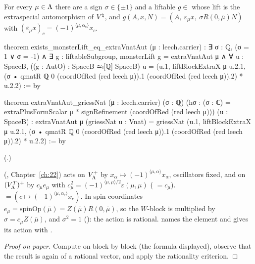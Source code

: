 \begin{theorem}\label{ch21:thm:extra}
For every $\mu\in{\Lambda}$ there are a sign $\sigma\in\{\pm1\}$ and a liftable $g\in$  whose lift is
the extraspecial automorphism  of ${V^{\natural}}$, and $g(A,x,N)=(A,\ \varepsilon_\mu x,\ \sigma R(0,\bar\mu)N)$
with $(\varepsilon_\mu x)_c=(-1)^{\langle\mu,\alpha_c\rangle}x_c$.
\end{theorem}
\begin{leancode}
theorem exists_monsterLift_eq_extraVnatAut (μ : leech.carrier) :
    ∃ σ : ℚ, (σ = 1 ∨ σ = -1) ∧ ∃ g : liftableSubgroup, monsterLift g = extraVnatAut μ ∧
      ∀ u : SpaceB, ((g : AutO) : SpaceB ≃ₗ[ℚ] SpaceB) u
        = (u.1, liftBlockExtraX μ u.2.1,
            (σ • qmatR ℚ 0 (coordOfRed (red leech μ)).1 (coordOfRed (red leech μ)).2) * u.2.2) := by
\end{leancode}
\begin{leancode}
theorem extraVnatAut_griessNat (μ : leech.carrier) (σ : ℚ)
    (hσ : (σ : ℂ) = extraPlusFormScalar μ * signRefinement (coordOfRed (red leech μ)))
    (u : SpaceB) :
    extraVnatAut μ (griessNat u : Vnat)
      = griessNat (u.1, liftBlockExtraX μ u.2.1,
          (σ • qmatR ℚ 0 (coordOfRed (red leech μ)).1 (coordOfRed (red leech μ)).2) * u.2.2) := by
\end{leancode}
(.)
\begin{dictionary}
 (, Chapter~\ref{ch:22}) acts on $V_{\Lambda}^+$
by $x_\alpha\mapsto(-1)^{\langle\mu,\alpha\rangle}x_\alpha$, oscillators fixed, and on $(V_{\Lambda}^T)^+$ by
$c_\mu e_\mu$ with $c_\mu^2=(-1)^{\langle\mu,\mu\rangle/2}\varepsilon(\mu,\mu)$
( $=c_\mu$).   $=(c\mapsto(-1)^{\langle\mu,\alpha_c\rangle}x_c)$.
In spin coordinates $e_\mu=\mathrm{spinOp}(\bar\mu)=Z(\bar\mu)R(0,\bar\mu)$, so the $W$-block is multiplied
by $\sigma=c_\mu Z(\bar\mu)$, and $\sigma^2=1$ (): the action is rational.
 names the element and  gives its action with
.
\end{dictionary}
\begin{proof}[Proof on paper]
Compute  on  block by block (the formula displayed), observe that the
result is again  of a rational vector, and apply the rationality criterion.
\end{proof}
